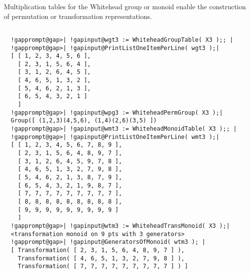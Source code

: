 \documentclass[a4paper,11pt]{report}
\begin{document}
{{{ Multiplication tables for the Whitehead group or monoid enable the
construction of permutation or transformation representations. }

 

 
\begin{Verbatim}[commandchars=!@|,fontsize=\small,frame=single,label=Example]
  
  !gapprompt@gap>| !gapinput@wgt3 := WhiteheadGroupTable( X3 );; |
  !gapprompt@gap>| !gapinput@PrintListOneItemPerLine( wgt3 );|
  [ [ 1, 2, 3, 4, 5, 6 ],
    [ 2, 3, 1, 5, 6, 4 ],
    [ 3, 1, 2, 6, 4, 5 ],
    [ 4, 6, 5, 1, 3, 2 ],
    [ 5, 4, 6, 2, 1, 3 ],
    [ 6, 5, 4, 3, 2, 1 ]
    ]
  !gapprompt@gap>| !gapinput@wpg3 := WhiteheadPermGroup( X3 );|
  Group([ (1,2,3)(4,5,6), (1,4)(2,6)(3,5) ])
  !gapprompt@gap>| !gapinput@wmt3 := WhiteheadMonoidTable( X3 );; |
  !gapprompt@gap>| !gapinput@PrintListOneItemPerLine( wmt3 );|
  [ [ 1, 2, 3, 4, 5, 6, 7, 8, 9 ],
    [ 2, 3, 1, 5, 6, 4, 8, 9, 7 ],
    [ 3, 1, 2, 6, 4, 5, 9, 7, 8 ],
    [ 4, 6, 5, 1, 3, 2, 7, 9, 8 ],
    [ 5, 4, 6, 2, 1, 3, 8, 7, 9 ],
    [ 6, 5, 4, 3, 2, 1, 9, 8, 7 ],
    [ 7, 7, 7, 7, 7, 7, 7, 7, 7 ],
    [ 8, 8, 8, 8, 8, 8, 8, 8, 8 ],
    [ 9, 9, 9, 9, 9, 9, 9, 9, 9 ]
    ]
  !gapprompt@gap>| !gapinput@wtm3 := WhiteheadTransMonoid( X3 );|
  <transformation monoid on 9 pts with 3 generators>
  !gapprompt@gap>| !gapinput@GeneratorsOfMonoid( wtm3 ); |
  [ Transformation( [ 2, 3, 1, 5, 6, 4, 8, 9, 7 ] ), 
    Transformation( [ 4, 6, 5, 1, 3, 2, 7, 9, 8 ] ), 
    Transformation( [ 7, 7, 7, 7, 7, 7, 7, 7, 7 ] ) ]
  
\end{Verbatim}
 }

 }

            
\end{document}
